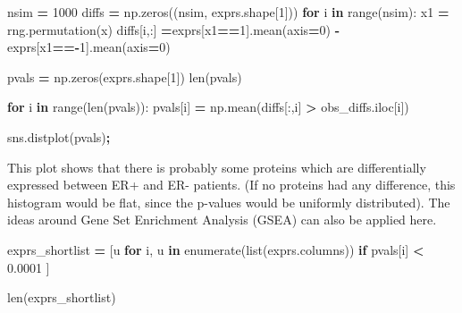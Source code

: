 \documentclass[
  letterpaper,
]{scrbook}
\newenvironment{Shaded}{\begin{snugshade}}{\end{snugshade}}
\newcommand{\BuiltInTok}[1]{#1}
\newcommand{\ControlFlowTok}[1]{\textcolor[rgb]{0.13,0.29,0.53}{\textbf{#1}}}
\newcommand{\DecValTok}[1]{\textcolor[rgb]{0.00,0.00,0.81}{#1}}
\newcommand{\FloatTok}[1]{\textcolor[rgb]{0.00,0.00,0.81}{#1}}
\newcommand{\KeywordTok}[1]{\textcolor[rgb]{0.13,0.29,0.53}{\textbf{#1}}}
\newcommand{\NormalTok}[1]{#1}
\newcommand{\OperatorTok}[1]{\textcolor[rgb]{0.81,0.36,0.00}{\textbf{#1}}}
\begin{document}
\begin{Shaded}
\begin{Highlighting}[]
\NormalTok{nsim }\OperatorTok{=} \DecValTok{1000}
\NormalTok{diffs }\OperatorTok{=}\NormalTok{ np.zeros((nsim, exprs.shape[}\DecValTok{1}\NormalTok{]))}
\ControlFlowTok{for}\NormalTok{ i }\KeywordTok{in} \BuiltInTok{range}\NormalTok{(nsim):}
\NormalTok{    x1 }\OperatorTok{=}\NormalTok{ rng.permutation(x)}
\NormalTok{    diffs[i,:] }\OperatorTok{=}\NormalTok{exprs[x1}\OperatorTok{==}\DecValTok{1}\NormalTok{].mean(axis}\OperatorTok{=}\DecValTok{0}\NormalTok{) }\OperatorTok{{-}}\NormalTok{ exprs[x1}\OperatorTok{=={-}}\DecValTok{1}\NormalTok{].mean(axis}\OperatorTok{=}\DecValTok{0}\NormalTok{)}
\end{Highlighting}
\end{Shaded}

\begin{Shaded}
\begin{Highlighting}[]
\NormalTok{pvals }\OperatorTok{=}\NormalTok{ np.zeros(exprs.shape[}\DecValTok{1}\NormalTok{])}
\BuiltInTok{len}\NormalTok{(pvals)}
\end{Highlighting}
\end{Shaded}

\begin{Shaded}
\begin{Highlighting}[]
\ControlFlowTok{for}\NormalTok{ i }\KeywordTok{in} \BuiltInTok{range}\NormalTok{(}\BuiltInTok{len}\NormalTok{(pvals)):}
\NormalTok{    pvals[i] }\OperatorTok{=}\NormalTok{ np.mean(diffs[:,i] }\OperatorTok{\textgreater{}}\NormalTok{ obs\_diffs.iloc[i])}

\NormalTok{sns.distplot(pvals)}\OperatorTok{;}
\end{Highlighting}
\end{Shaded}

This plot shows that there is probably some proteins which are differentially expressed between ER+ and ER- patients. (If no proteins had any difference, this histogram would be flat, since the p-values would be uniformly distributed). The ideas around Gene Set Enrichment Analysis (GSEA) can also be applied here.

\begin{Shaded}
\begin{Highlighting}[]
\NormalTok{exprs\_shortlist }\OperatorTok{=}\NormalTok{ [u }\ControlFlowTok{for}\NormalTok{ i, u }\KeywordTok{in} \BuiltInTok{enumerate}\NormalTok{(}\BuiltInTok{list}\NormalTok{(exprs.columns)) }\ControlFlowTok{if}\NormalTok{ pvals[i] }\OperatorTok{\textless{}} \FloatTok{0.0001}\NormalTok{ ]}

\BuiltInTok{len}\NormalTok{(exprs\_shortlist)}
\end{Highlighting}
\end{Shaded}
\end{document}
